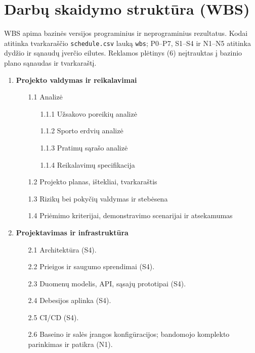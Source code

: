 \section{Darbų skaidymo struktūra (WBS)}\label{sec:wbs}

WBS apima bazinės versijos programinius ir neprograminius rezultatus. Kodai atitinka tvarkaraščio \texttt{schedule.csv} lauką \texttt{wbs}; P0--P7, S1--S4 ir N1--N5 atitinka dydžio ir sąnaudų įverčio eilutes. Reklamos plėtinys (6) neįtrauktas į bazinio plano sąnaudas ir tvarkaraštį.

\begin{enumerate}
\item \textbf{Projekto valdymas ir reikalavimai}
  \begin{enumerate}
  \item[1.1] Analizė
    \begin{enumerate}
        \item[1.1.1] Užsakovo poreikių analizė
        \item[1.1.2] Sporto erdvių analizė
        \item[1.1.3] Pratimų sąrašo analizė
        \item[1.1.4] Reikalavimų specifikacija
    \end{enumerate}

  
  \item[1.2] Projekto planas, ištekliai, tvarkaraštis 
  \item[1.3] Rizikų bei pokyčių valdymas ir stebėsena
  \item[1.4 ] Priėmimo kriterijai, demonstravimo scenarijai ir atsekamumas
  \end{enumerate}
\item \textbf{Projektavimas ir infrastruktūra}
  \begin{enumerate}
  \item[2.1] Architektūra (S4).
  \item[2.2] Prieigos ir saugumo sprendimai (S4).
  \item[2.3] Duomenų modelis, API, sąsajų prototipai (S4).
  \item[2.4] Debesijos aplinka (S4).
  \item[2.5] CI/CD (S4).
  \item[2.6] Baseino ir salės įrangos konfigūracijos; bandomojo komplekto parinkimas ir patikra (N1).
    

\end{enumerate}
\end{enumerate}
